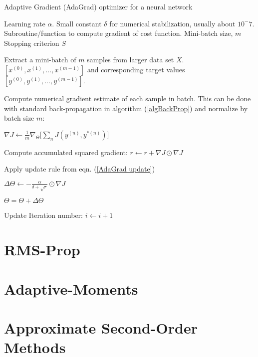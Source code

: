 \documentclass[12pt,letterpaper]{article}
\begin{document}
\begin{algorithm}[H]
\caption{Adaptive Gradient (AdaGrad) optimizer for a neural network}
\label{algAdaGrad}

\begin{algorithmic}

\REQUIRE Learning rate $\alpha$.
\REQUIRE Small constant $\delta$ for numerical stabilization, usually about $10^-7$.
\REQUIRE Subroutine/function to compute gradient of cost function.
\REQUIRE Mini-batch size, $m$
\REQUIRE Stopping criterion $S$

	\item Extract a mini-batch of $m$ samples from larger data set $X$. $[x^{(0)},x^{(1)},...,x^{(m-1)}]$ and corresponding target values 
	$[y^{(0)},y^{(1)},...,y^{(m-1)}]$.
	\item Compute numerical gradient estimate of each sample in batch. This can be done with standard back-propagation in algorithm (\ref{algBackProp}) and 			 	normalize by batch size $m$:
	\item $\nabla J \leftarrow \frac{1}{m}\nabla_{\Theta} \Big[ \sum_n J(y^{(n)},y^{*(n)}) \Big] $
	\item Compute accumulated squared gradient: $r \leftarrow r  + \nabla J \odot \nabla J$
	\item Apply update rule from eqn. (\ref{AdaGrad update})
	\item $\Delta \Theta \leftarrow -\frac{\alpha}{\delta+\sqrt{r}} \odot \nabla J$
	\item $\Theta = \Theta + \Delta \Theta$	
	\item Update Iteration number: $i \leftarrow i + 1$
\ENDWHILE

\end{algorithmic}
\end{algorithm}

\section{RMS-Prop}


\section{Adaptive-Moments}


\section{Approximate Second-Order Methods}
\end{document}
